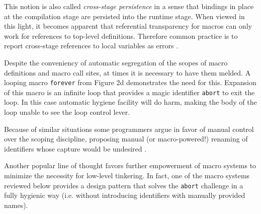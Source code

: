 \documentclass[10pt,journal,a4paper]{IEEEtran}
\begin{document}
This notion is also called \emph{cross-stage persistence} in a sense that bindings in place
at the compilation stage are persisted into the runtime stage. When viewed in this light,
it becomes apparent that referential transparency for macros can only work for references
to top-level definitions. Therefore common practice is to report cross-stage references to local variables
as errors \cite{dybvig92}.

Despite the conveniency of automatic segregation of the scopes of macro definitions and macro call sites,
at times it is necessary to have them melded.
A looping macro \small \texttt{forever} \normalsize from Figure 2d demonstrates the need for this.
Expansion of this macro is an infinite loop that provides a magic identifier \small \texttt{abort} \normalsize
to exit the loop. In this case automatic hygiene facility will do harm, making the body of the loop
unable to see the loop control lever.

Because of similar situations some programmers argue in favor of manual control over
the scoping discipline, proposing manual (or macro-powered!) renaming of identifiers whose capture would be
undesired \cite{clinger91,hoyte08}.

Another popular line of thought favors further empowerment of macro systems
to minimize the necessity for low-level tinkering.
In fact, one of the macro systems reviewed below provides a design pattern \cite{barzilay11}
that solves the \small \texttt{abort} \normalsize challenge in a fully hygienic way (i.e. without introducing
identifiers with manually provided names).
\end{document}
